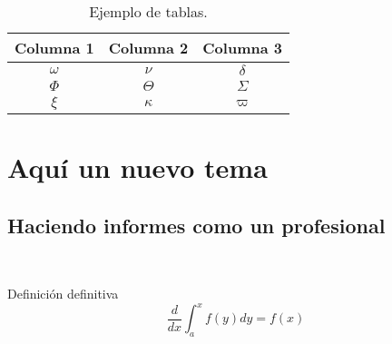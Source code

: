 	\begin{table}[H]
		\centering
		\caption{Ejemplo de tablas.}
		\begin{tabular}{ccc}
			\hline
			\textbf{Columna 1} & \textbf{Columna 2} & \textbf{Columna 3} \bigstrut\\
			\hline
			$\omega$ & $\nu$ & $\delta$ \bigstrut[t]\\
			$\Phi$ & $\Theta$ & $\varSigma$ \\
			$\xi$ & $\kappa$ & $\varpi$ \bigstrut[b] \\
			\hline
		\end{tabular}
		\label{tab:tabla-1}
	\end{table}


\clearpage
\section{Aquí un nuevo tema}

\subsection{Haciendo informes como un profesional}


	~ \lipsum[1] \\

	\lipsum[115]


	\begin{defn}
		Definición definitiva
		$$\frac{d}{dx}\int_a^xf(y)dy=f(x)$$
	\end{defn}

